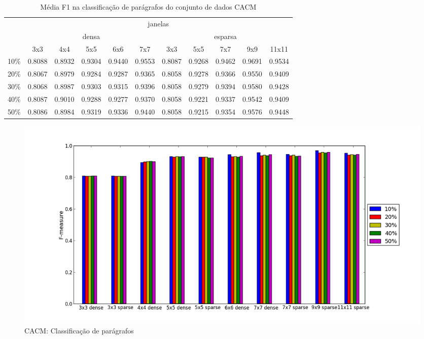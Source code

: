\documentclass[a4paper,11pt]{article}
\begin{document}
  \begin{center}
    \begin{table}[p]
      \caption{Média F1 na classificação de parágrafos do conjunto de dados CACM}
      \begin{tabular}{ l | c c c c c || c c c c c | }
        \cline{2-11}
        & \multicolumn{10}{|c|}{janelas} \\
        \cline{2-11}
        & \multicolumn{5}{c||}{densa} & \multicolumn{5}{c|}{esparsa} \\
        \cline{2-11}
        & 3x3 & 4x4 & 5x5 & 6x6 & 7x7 & 3x3 & 5x5 & 7x7 & 9x9 & 11x11 \\
        \hline
        \multicolumn{1}{|l|}{10\%}& 0.8088& 0.8932& 0.9304& 0.9440& 0.9553& 0.8087& 0.9268& 0.9462& 0.9691& 0.9534\\
        \multicolumn{1}{|l|}{20\%}& 0.8067& 0.8979& 0.9284& 0.9287& 0.9365& 0.8058& 0.9278& 0.9366& 0.9550& 0.9409\\
        \multicolumn{1}{|l|}{30\%}& 0.8068& 0.8987& 0.9303& 0.9315& 0.9396& 0.8058& 0.9279& 0.9394& 0.9580& 0.9428\\
        \multicolumn{1}{|l|}{40\%}& 0.8087& 0.9010& 0.9288& 0.9277& 0.9370& 0.8058& 0.9221& 0.9337& 0.9542& 0.9409\\
        \multicolumn{1}{|l|}{50\%}& 0.8086& 0.8984& 0.9319& 0.9336& 0.9440& 0.8058& 0.9215& 0.9354& 0.9576& 0.9448\\
        \hline  
      \end{tabular}
      \label{tab:cacm_f1_paragraph}
    \end{table}
  \end{center}

  \begin{figure}[p]
    \centerline{\includegraphics[width=1.2\textwidth]{assets/experiment_charts/cacm_TextRegion_paragraph_f1.png}}
    \caption{CACM: Classificação de parágrafos}
    \label{fig:cacm_TextRegion_paragraph_f1}
  \end{figure}
\end{document}
